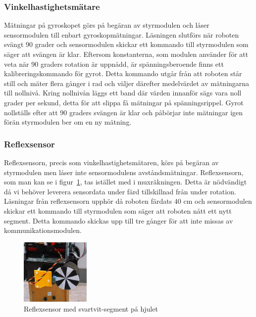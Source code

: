\documentclass[a4paper,12pt,fleqn]{article}
\begin{document}
\subsubsection{Vinkelhastighetsmätare}
Mätningar på gyroskopet görs på begäran av styrmodulen och låser sensormodulen till enbart gyroskopmätningar. 
Läsningen slutförs när roboten svängt 90 grader och sensormodulen skickar ett kommando till styrmodulen som säger att svängen är klar. Eftersom konstanterna, som modulen använder för att veta när 90 graders rotation är uppnådd, är spänningsberoende finns ett kalibreringskommando för gyrot. Detta kommando utgår från att roboten står still och mäter flera gånger i rad och väljer därefter medelvärdet av mätningarna till nollnivå. Kring nollnivån läggs ett band där värden innanför sägs vara noll grader per sekund, detta för att slippa få mätningar på spänningsrippel. Gyrot nollställs efter att 90 graders svängen är klar och påbörjar inte mätningar igen förän styrmodulen ber om en ny mätning.

\subsubsection{Reflexsensor}
Reflexsensorn, precis som vinkelhastighetsmätaren, körs på begäran av styrmodulen men låser inte sensormodulens avståndsmätningar. Reflexsensorn, som man kan se i figur~\ref{fig:reflex}, tas istället med i muxräkningen. Detta är nödvändigt då vi behöver leverera sensordata under färd tillskillnad från under rotation. Läsningar från reflexsensorn upphör då roboten färdats $40$ cm och sensormodulen skickar ett kommando till styrmodulen
som säger att roboten nått ett nytt segment. Detta kommando skickas upp till tre gånger för att inte missas av kommunikationsmodulen.

\begin{figure}[htp] %
  \begin{center}
  \includegraphics[keepaspectratio=true,width=0.3\textwidth]{reflexsensor.png}  %
  \end{center}
  \caption{Reflexsensor med svartvit-segment på hjulet} %
  \label{fig:reflex}
\end{figure}
\end{document}

